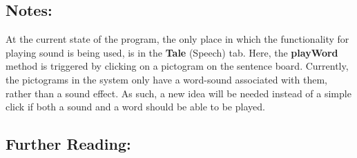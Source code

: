 \subsection*{Notes:}
At the current state of the program, the only place in which the functionality for playing sound is being used, is in the \textbf{Tale} (Speech) tab. Here, the \textbf{playWord} method is triggered by clicking on a pictogram on the sentence board.\newline
Currently, the pictograms in the system only have a word-sound associated with them, rather than a sound effect. As such, a new idea will be needed instead of a simple click if both a sound and a word should be able to be played.

\subsection*{Further Reading:}